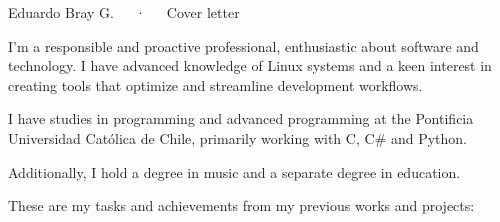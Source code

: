 \documentclass[12pt, a4paper]{awesome-cv}
\begin{document}
\makecvheader[R]

\makecvfooter
{}
{Eduardo Bray G.~~~·~~~Cover letter}
{}

\makelettertitle

\begin{cvletter}

	I'm a responsible and proactive professional, enthusiastic about software
	and technology. I have advanced knowledge of Linux systems and a keen
	interest in creating tools that optimize and streamline development
	workflows.

	I have studies in programming and advanced programming at the Pontificia
	Universidad Católica de Chile, primarily working with C, C# and Python.

	Additionally, I hold a degree in music and a separate degree in education.

	These are my tasks and achievements from my previous works and projects:

\end{cvletter}


\end{document}
